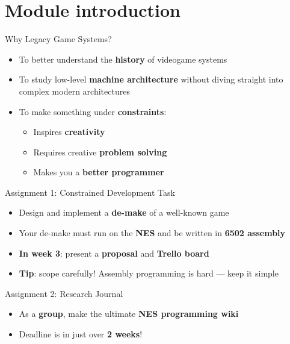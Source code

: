 \part{Module introduction}
\frame{\partpage}

\begin{frame}{Why Legacy Game Systems?}
	\begin{itemize}
		\pause\item To better understand the \textbf{history} of videogame systems
		\pause\item To study low-level \textbf{machine architecture}
			without diving straight into complex modern architectures
		\pause\item To make something under \textbf{constraints}:
			\begin{itemize}
				\pause\item Inspires \textbf{creativity}
				\pause\item Requires creative \textbf{problem solving}
				\pause\item Makes you a \textbf{better programmer}
			\end{itemize}
	\end{itemize}
\end{frame}

\begin{frame}{Assignment 1: Constrained Development Task}
	\begin{itemize}
		\pause\item Design and implement a \textbf{de-make} of a well-known game
		\pause\item Your de-make must run on the \textbf{NES} and be written in \textbf{6502 assembly}
		\pause\item \textbf{In week 3}: present a \textbf{proposal} and \textbf{Trello board}
		\pause\item \textbf{Tip}: scope carefully! Assembly programming is hard --- keep it simple
	\end{itemize}
\end{frame}

\begin{frame}{Assignment 2: Research Journal}
	\begin{itemize}
		\pause\item As a \textbf{group}, make the ultimate \textbf{NES programming wiki}
		\pause\item Deadline is in just over \textbf{2 weeks}!
	\end{itemize}
\end{frame}

